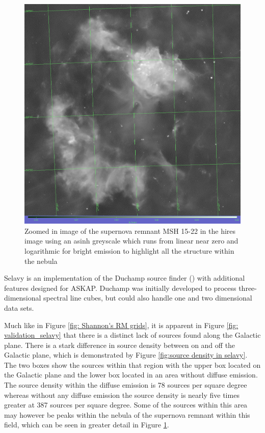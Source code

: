 \begin{figure}
    \centering
    \includegraphics[width=\linewidth]{Thesis_Template/Figures/MSH22-15 hires.png}
    \caption{Zoomed in image of the supernova remnant MSH 15-22 in the hires image using an asinh greyscale which runs from linear near zero and logarithmic for bright emission to highlight all the structure within the nebula}
    \label{fig:sn remnant}
\end{figure}

Selavy is an implementation of the Duchamp source finder (\cite{Duchamp_Whiting_2012}) with additional features designed for ASKAP. Duchamp was initially developed to process three-dimensional spectral line cubes, but could also handle one and two dimensional data sets. 

Much like in Figure \ref{fig: Shannon's RM grids}, it is apparent in Figure \ref{fig: validation_selavy} that there is a distinct lack of sources found along the Galactic plane. There is a stark difference in source density between on and off the Galactic plane, which is demonstrated by Figure \ref{fig:source density in selavy}. The two boxes show the sources within that region with the upper box located on the Galactic plane and the lower box located in an area without diffuse emission. The source density within the diffuse emission is 78 sources per square degree whereas without any diffuse emission the source density is nearly five times greater at 387 sources per square degree. Some of the sources within this area may however be peaks within the nebula of the supernova remnant within this field, which can be seen in greater detail in Figure \ref{fig:sn remnant}.

